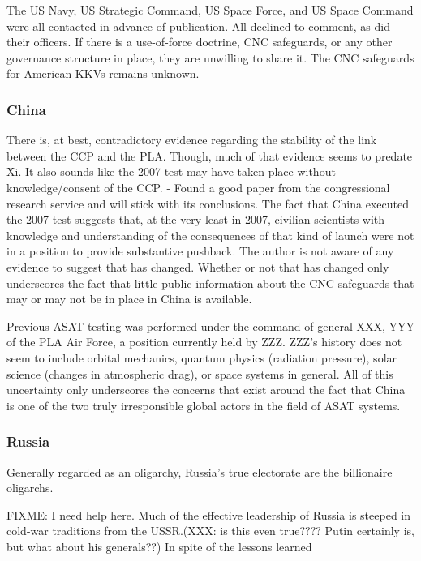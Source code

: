 The US Navy, US Strategic Command, US Space Force, and US Space
Command were all contacted in advance of publication.  All declined to
comment, as did their officers.  If there is a use-of-force doctrine,
CNC safeguards, or any other governance structure in place, they are
unwilling to share it. The CNC safeguards for American KKVs remains
unknown.

\subsubsection{China}

There is, at best, contradictory evidence regarding the stability of
the link between the CCP and the PLA.  Though, much of that evidence
seems to predate Xi.  It also sounds like the 2007 test may have taken
place without knowledge/consent of the CCP. - Found a good paper from
the congressional research service and will stick with its
conclusions.  The fact that China executed the 2007 test suggests
that, at the very least in 2007, civilian scientists with knowledge
and understanding of the consequences of that kind of launch were not
in a position to provide substantive pushback.  The author is not
aware of any evidence to suggest that has changed.  Whether or not
that has changed only underscores the fact that little public
information about the CNC safeguards that may or may not be in place
in China is available.

Previous ASAT testing was performed under the command of general XXX,
YYY of the PLA Air Force, a position currently held by ZZZ.  ZZZ's
history does not seem to include orbital mechanics, quantum physics
(radiation pressure), solar science (changes in atmospheric drag), or
space systems in general.  All of this uncertainty only underscores
the concerns that exist around the fact that China is one of the two
truly irresponsible global actors in the field of ASAT systems.

\subsubsection{Russia}

Generally regarded as an oligarchy, Russia's true electorate are the
billionaire oligarchs.

FIXME: I need help here.  Much of the effective leadership of Russia
is steeped in cold-war traditions from the USSR.(XXX: is this even
true????  Putin certainly is, but what about his generals??)  In spite
of the lessons learned

